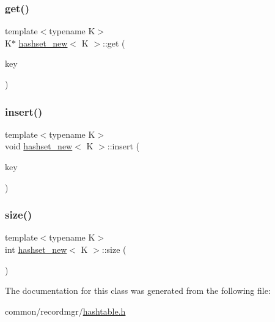 \mbox{\label{classhashset__new_a2d37e290e39056bd9d47dcd9848bda0c}} 
\subsubsection{\texorpdfstring{get()}{get()}}
{\footnotesize\ttfamily template$<$typename K$>$ \\
K$\ast$ \hyperlink{classhashset__new}{hashset\+\_\+new}$<$ K $>$\+::get (\begin{DoxyParamCaption}\item[{K $\ast$const}]{key }\end{DoxyParamCaption})\hspace{0.3cm}{\ttfamily [inline]}}

\mbox{\label{classhashset__new_ad46652bfebe22a086f4f648d2bdfd211}} 
\subsubsection{\texorpdfstring{insert()}{insert()}}
{\footnotesize\ttfamily template$<$typename K$>$ \\
void \hyperlink{classhashset__new}{hashset\+\_\+new}$<$ K $>$\+::insert (\begin{DoxyParamCaption}\item[{K $\ast$const}]{key }\end{DoxyParamCaption})\hspace{0.3cm}{\ttfamily [inline]}}

\mbox{\label{classhashset__new_a15deeb34e1e00deafb9fac0511ada052}} 
\subsubsection{\texorpdfstring{size()}{size()}}
{\footnotesize\ttfamily template$<$typename K$>$ \\
int \hyperlink{classhashset__new}{hashset\+\_\+new}$<$ K $>$\+::size (\begin{DoxyParamCaption}{ }\end{DoxyParamCaption})\hspace{0.3cm}{\ttfamily [inline]}}



The documentation for this class was generated from the following file\+:\begin{DoxyCompactItemize}
\item 
common/recordmgr/\hyperlink{hashtable_8h}{hashtable.\+h}\end{DoxyCompactItemize}
